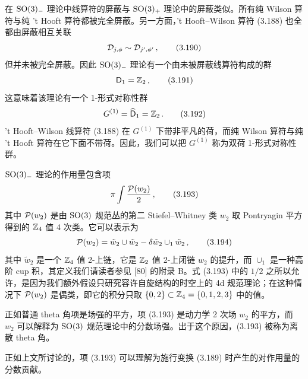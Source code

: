 

在 $\mathrm{SO}(3)_-$ 理论中线算符的屏蔽与 $\mathrm{SO}(3)_+$ 理论中的屏蔽类似。所有纯 Wilson 算符与纯 't Hooft 算符都被完全屏蔽。另一方面，'t Hooft--Wilson 算符 (3.188) 也全都由屏蔽相互关联
\begin{equation}
    \mathcal{D}_{j,\phi} \sim \mathcal{D}_{j',\phi'} \,,
    \tag{3.190}
\end{equation}
但并未被完全屏蔽。因此 $\mathrm{SO}(3)_-$ 理论有一个由未被屏蔽线算符构成的群
\begin{equation}
    \mathsf{D}_1 = \mathbb{Z}_2 \,,
    \tag{3.191}
\end{equation}
这意味着该理论有一个 1-形式对称性群
\begin{equation}
    G^{(1)} = \widehat{\mathsf{D}}_1 = \mathbb{Z}_2 \,.
    \tag{3.192}
\end{equation}
't Hooft--Wilson 线算符 (3.188) 在 $G^{(1)}$ 下带非平凡的荷，而纯 Wilson 算符与纯 't Hooft 算符在它下面不带荷。因此，我们可以把 $G^{(1)}$ 称为双荷 1-形式对称性群。

$\mathrm{SO}(3)_-$ 理论的作用量包含项
\begin{equation}
    \pi \int \frac{\mathcal{P}(w_2)}{2} \,,
    \tag{3.193}
\end{equation}
其中 $\mathcal{P}(w_2)$ 是由 $\mathrm{SO}(3)$ 规范丛的第二 Stiefel--Whitney 类 $w_2$ 取 Pontryagin 平方得到的 $\mathbb{Z}_4$ 值 4 次类。它可以表示为
\begin{equation}
    \mathcal{P}(w_2) = \tilde{w}_2 \cup \tilde{w}_2 - \delta \tilde{w}_2 \cup_1 \tilde{w}_2 \,,
    \tag{3.194}
\end{equation}
其中 $\tilde{w}_2$ 是一个 $\mathbb{Z}_4$ 值 2-上链，它是 $\mathbb{Z}_2$ 值 2-上闭链 $w_2$ 的提升，而 $\cup_1$ 是一种高阶 cup 积，其定义我们请读者参见 [80] 的附录 B。式 (3.193) 中的 $1/2$ 之所以允许，是因为我们额外假设只研究容许自旋结构的时空上的 4d 规范理论；在这种情况下 $\mathcal{P}(w_2)$ 是偶类，即它的积分只取 $\{0,2\} \subset \mathbb{Z}_4 = \{0,1,2,3\}$ 中的值。

正如普通 theta 角项是场强的平方，项 (3.193) 是动力学 2 次场 $w_2$ 的平方，而 $w_2$ 可以解释为 $\mathrm{SO}(3)$ 规范理论中的分数场强。出于这个原因，(3.193) 被称为离散 theta 角。

正如上文所讨论的，项 (3.193) 可以理解为施行变换 (3.189) 时产生的对作用量的分数贡献。

